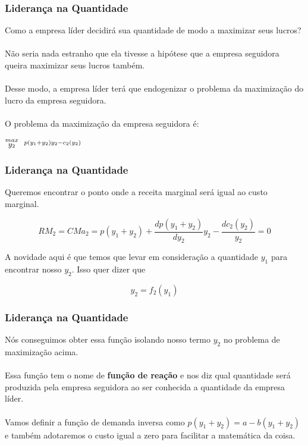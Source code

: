 \documentclass{beamer}[10]
\begin{document}
\begin{frame}
	\frametitle{Liderança na Quantidade}

	Como a empresa líder decidirá sua quantidade de modo a maximizar seus lucros?
	\\~\\
	Não seria nada estranho que ela tivesse a hipótese que a empresa seguidora queira maximizar seus lucros também.
	\\~\\
	Desse modo, a empresa líder terá que endogenizar o problema da maximização do lucro da empresa seguidora.
	\\~\\
	O problema da maximização da empresa seguidora é:

	\begin{center}
	\LARGE $\stackrel{max}{\text{\small $y_2$}} \ \ \stackrel{p(y_1 + y_2)y_2 - c_2(y_2)}{\ }$ \\
	\end{center}

\end{frame}

\begin{frame}
	\frametitle{Liderança na Quantidade}

	Queremos encontrar o ponto onde a receita marginal será igual ao custo marginal.

	$$ RM_2 = CMa_2 = p(y_1 + y_2) + \frac{dp(y_1+y_2)}{dy_2}y_2 - \frac{dc_2(y_2)}{y_2} = 0 $$

	A novidade aqui é que temos que levar em consideração a quantidade $y_1$ para encontrar nosso $y_2$. Isso quer dizer que 

	$$y_2 = f_2(y_1)$$

\end{frame}

\begin{frame}
	\frametitle{Liderança na Quantidade}

	Nós conseguimos obter essa função isolando nosso termo $y_2$ no problema de maximização acima.
	\\~\\
	Essa função tem o nome de \textbf{função de reação} e nos diz qual quantidade será produzida pela empresa seguidora ao ser conhecida a quantidade da empresa líder.
	\\~\\
	Vamos definir a função de demanda inversa como $p(y_1 + y_2) = a - b(y_1 + y_2)$ e também adotaremos o custo igual a zero para facilitar a matemática da coisa.

\end{frame}
\end{document}
